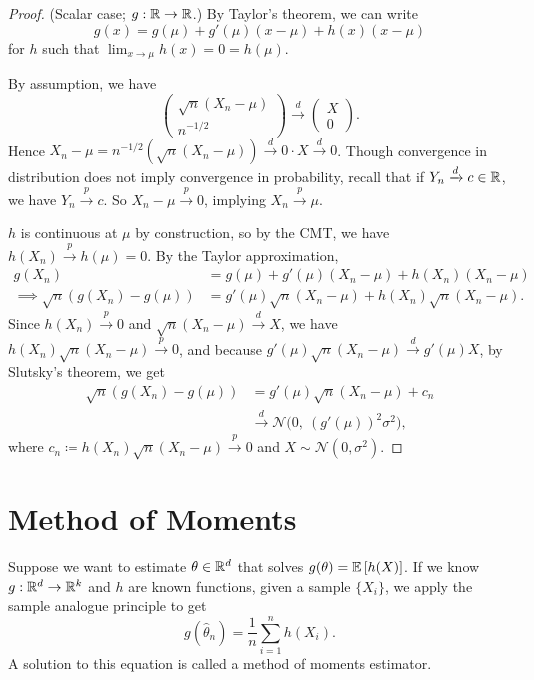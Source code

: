 \begin{proof}
	(Scalar case; $g: \mathbb{R} \to \mathbb{R}$.) 
	By Taylor's theorem, we can write \[
		g(x) = g(\mu) + g'(\mu) (x - \mu) + h(x) (x- \mu)
	\] for $h$ such that $\lim_{x \to \mu} h(x) = 0 = h(\mu)$.

	By assumption, we have \[
		\begin{pmatrix}
		\sqrt{n} (X_n - \mu) \\
		n^{-1/2}
		\end{pmatrix} \xrightarrow{d} \begin{pmatrix}
		X \\
		0
		\end{pmatrix} 
	.\] Hence $X_n - \mu = n^{-1/2} \left( \sqrt{n}\left( X_n - \mu \right) \right)\xrightarrow{d} 0 \cdot X \xrightarrow{d} 0$. Though convergence in distribution does not imply convergence in probability, recall that if $Y_n \xrightarrow{d} c \in \mathbb{R}$, we have $Y_n \xrightarrow{p} c$. So $X_n - \mu \xrightarrow{p} 0$, implying $X_n \xrightarrow{p} \mu$.

	$h$ is continuous at $\mu$ by construction, so by the CMT, we have $h(X_n) \xrightarrow{p} h(\mu) = 0$.
	By the Taylor approximation, 
	\begin{align*}
		g(X_n) &= g(\mu) + g'(\mu)(X_n - \mu) + h(X_n) (X_n - \mu) \\
		\implies \sqrt{n}  \left( g(X_n) - g(\mu) \right) &= g'(\mu) \sqrt{n} (X_n - \mu) + h(X_n) \sqrt{n}  (X_n - \mu)
	.\end{align*}
	Since $h(X_n) \xrightarrow{p}0$ and $\sqrt{n} (X_n - \mu) \xrightarrow{d}X$, we have $h(X_n)\sqrt{n}(X_n-\mu)\xrightarrow{p}0$, and because $g'(\mu)\sqrt{n} (X_{n} - \mu) \xrightarrow{d}g'(\mu)X$, by Slutsky's theorem, we get
	\begin{align*}
		\sqrt{n} \left( g(X_n) - g(\mu) \right) &= g'(\mu) \sqrt{n} \left( X_n - \mu \right) + c_n \\
												& \xrightarrow{d} \mathcal{N}\big(0,\ (g'(\mu))^2 \sigma^2\big)
	,\end{align*}
	where $c_n \coloneqq h(X_n)\sqrt{n}(X_n-\mu)\xrightarrow{p}0$ and $X\sim \mathcal{N}(0,\sigma^2)$.
\end{proof}
\section{Method of Moments}

\begin{definition}
	Suppose we want to estimate $\theta \in \mathbb{R}^d$ that solves $g(\theta) = \mathbb{E}\left[h(X)\right] $. If we know $g: \mathbb{R}^d \to \mathbb{R}^k$ and $h$ are known functions, given a sample $\{X_i\}$, we apply the sample analogue principle to get \[
		g(\hat{\theta}_n) = \frac{1}{n} \sum\limits_{i=1}^{n} h(X_i)
	.\] A solution to this equation is called a method of moments estimator.
\end{definition}

